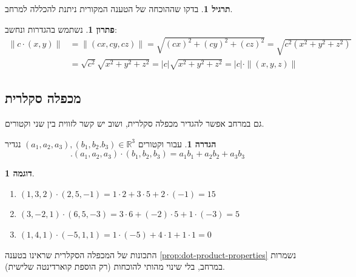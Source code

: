 \documentclass[12pt]{report}
\theoremstyle{plain}
\theoremstyle{definition}
\newtheorem{definition}[theorem]{הגדרה}
\newtheorem{example}{דוגמה}[chapter]
\newtheorem{exercise}{תרגיל}[chapter]
\newtheorem*{solution}{פתרון}
\newcommand{\R}{\mathbb{R}}
\newcommand{\0}{\mathbf{0}}
\begin{document}
\begin{exercise}
בדקו שההוכחה של הטענה המקורית ניתנת להכללה למרחב.
\end{exercise}

\begin{solution}
נשתמש בהגדרות ונחשב:
\begin{align*}
\|c\cdot(x,y)\|&=\|(cx,cy,cz)\|=\sqrt{(cx)^2+(cy)^2+(cz)^2}=\sqrt{c^2(x^2+y^2+z^2)} \\\
&=\sqrt{c^2}\sqrt{x^2+y^2+z^2}=|c|\sqrt{x^2+y^2+z^2}=|c|\cdot\|(x,y,z)\|
\end{align*}
\end{solution}

\subsection{מכפלה סקלרית}

גם במרחב אפשר להגדיר מכפלה סקלרית, ושוב יש קשר לזווית בין שני וקטורים.

\begin{definition}
עבור וקטורים
$(a_1,a_2,a_3),(b_1,b_2.b_3)\in\R^3$
נגדיר
$$
.(a_1,a_2,a_3)\cdot(b_1,b_2,b_3)=a_1b_1+a_2b_2+a_3b_3
$$
\end{definition}

\begin{example}\
\begin{enumerate}[label=\alph*.]
\item $(1,3,2)\cdot(2,5,-1)=1\cdot2+3\cdot5+2\cdot(-1)=15$

\item $(3,-2,1)\cdot(6,5,-3)=3\cdot6+(-2)\cdot5+1\cdot(-3)=5$

\item $(1,4,1)\cdot(-5,1,1)=1\cdot(-5)+4\cdot1+1\cdot1=0$
\end{enumerate}
\end{example}

התכונות של המכפלה הסקלרית שראינו בטענה
\ref{prop:dot-product-properties}
נשמרות במרחב, בלי שינוי מהותי להוכחות
(רק הוספת קוארדינטה שלישית).
\end{document}
